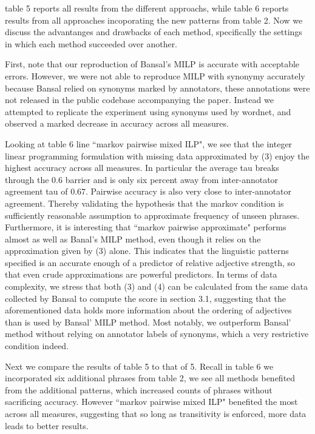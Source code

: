 table 5 reports all results from the different approachs, while table 6 reports results from all approaches incoporating the new patterns from table 2. Now we discuss the advantanges and drawbacks of each method, specifically the settings in which each method succeeded over another. 

First, note that our reproduction of Bansal's MILP is accurate with acceptable errors. However, we were not able to reproduce MILP with synonymy accurately because Bansal relied on synonyms marked by annotators, these annotations were not released in the public codebase accompanying the paper. Instead we attempted to replicate the experiment using synonyms used by wordnet, and observed a marked decrease in accuracy across all measures. 

Looking at table 6 line ``markov pairwise mixed ILP", we see that the integer linear programming formulation with missing data approximated by (3) enjoy the highest accuracy across all measures. In particular the average tau breaks through the $0.6$ barrier and is only six percent away from inter-annotator agreement tau of $0.67$. Pairwise accuracy is also very close to inter-annotator agreement. Thereby validating the hypothesis that the markov condition is sufficiently reasonable assumption to approximate frequency of unseen phrases. Furthermore, it is interesting that ``markov pairwise approximate" performs almost as well as Banal's MILP method, even though it relies on the approximation given by (3) alone. This indicates that the linguistic patterns specified is an accurate enough of a predictor of relative adjective strength, so that even crude approximations are powerful predictors. In terms of data complexity, we stress that both (3) and (4) can be calculated from the same data collected by Bansal to compute the score in section 3.1, suggesting that the aforementioned data holds more information about the ordering of adjectives than is used by Bansal' MILP method. Most notably, we outperform Bansal' method without relying on annotator labels of synonyms, which a very restrictive condition indeed.

Next we compare the results of table 5 to that of 5. Recall in table 6 we incorporated six additional phrases from table 2, we see all methods benefited from the additional patterns, which increased counts of phrases without sacrificing accuracy. However ``markov pairwise mixed ILP" benefited the most across all measures, suggesting that so long as transitivity is enforced, more data leads to better results. 

